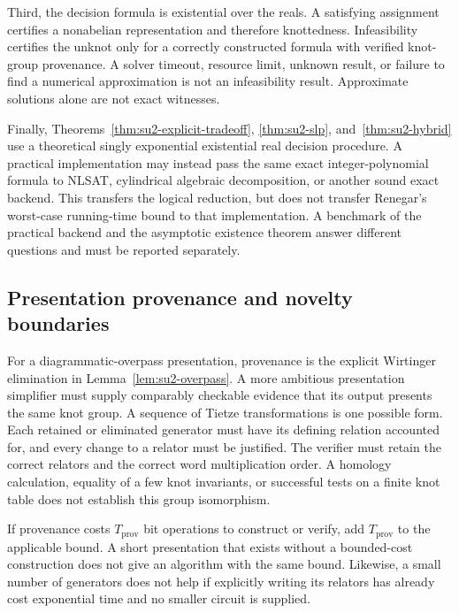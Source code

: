 Third, the decision formula is existential over the reals.  A satisfying
assignment certifies a nonabelian representation and therefore knottedness.
Infeasibility certifies the unknot only for a correctly constructed formula
with verified knot-group provenance.  A solver timeout, resource limit,
unknown result, or failure to find a numerical approximation is not an
infeasibility result.  Approximate solutions alone are not exact witnesses.

Finally, Theorems~\ref{thm:su2-explicit-tradeoff},
\ref{thm:su2-slp}, and~\ref{thm:su2-hybrid} use a theoretical
singly exponential existential real decision procedure.  A practical
implementation may instead pass the same exact integer-polynomial formula
to NLSAT, cylindrical algebraic decomposition, or another sound exact
backend.  This transfers the logical reduction, but does not transfer
Renegar's worst-case running-time bound to that implementation.  A benchmark
of the practical backend and the asymptotic existence theorem answer
different questions and must be reported separately.

\subsection{Presentation provenance and novelty boundaries}
\label{subsec:su2-provenance}

For a diagrammatic-overpass presentation, provenance is the explicit
Wirtinger elimination in Lemma~\ref{lem:su2-overpass}.  A more ambitious
presentation simplifier must supply comparably checkable evidence that its
output presents the same knot group.  A sequence of Tietze transformations
is one possible form.  Each retained or eliminated generator must have its
defining relation accounted for, and every change to a relator must be
justified.  The verifier must retain the correct relators and the correct
word multiplication order.  A homology calculation, equality of a few knot
invariants, or successful tests on a finite knot table does not establish
this group isomorphism.

If provenance costs $T_{\mathrm{prov}}$ bit operations to construct or
verify, add $T_{\mathrm{prov}}$ to the applicable bound.  A short
presentation that exists without a bounded-cost construction does not
give an algorithm with the same bound.  Likewise, a small number of
generators does not help if explicitly writing its relators has already
cost exponential time and no smaller circuit is supplied.

